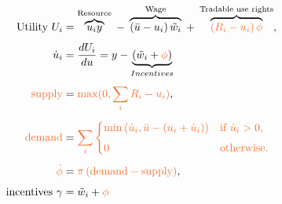 \documentclass[10pt]{article}
\begin{document}
\begin{align*}
\text{Utility  }  U_i &= \overbrace{u_i y}^{\text{Resource}} \;-\; \overbrace{(\bar{u}-u_i)\,\tilde{w}_i}^{\text{Wage}} \;+\; \overbrace{\textcolor{Orange}{(R_i - u_i)\,\phi}}^{\text{Tradable use rights}}, \\[4pt]
 \dot{u}_i & = \frac{dU_i}{du} = y - \underbrace{(\tilde{w}_i + \textcolor{Orange}{\phi})}_{Incentives} \\[4pt]
 \textcolor{Orange}{ \text{supply} } &= \textcolor{Orange}{ \max (0, \sum_{i} R_i - u_i ) }, \\[4pt]
\textcolor{Orange}{ \text{demand} } &= \textcolor{Orange}{ \sum_{i} \begin{cases} \min \left( \dot{u}_i, \bar{u}-(u_i+\dot{u}_i) \right) & \text{if } \dot{u}_i > 0 , \\[4pt] 0 & \text{otherwise}. \end{cases} } \\[4pt]
\textcolor{Orange}{ \dot{\phi}} &= \textcolor{Orange}{ \pi  \left( \text{demand} - \text{supply} \right) },\\[4pt]
\text{incentives   }  \gamma &= \tilde{w}_i + \textcolor{Orange}{ \phi}
 \end{align*}
\end{document}
